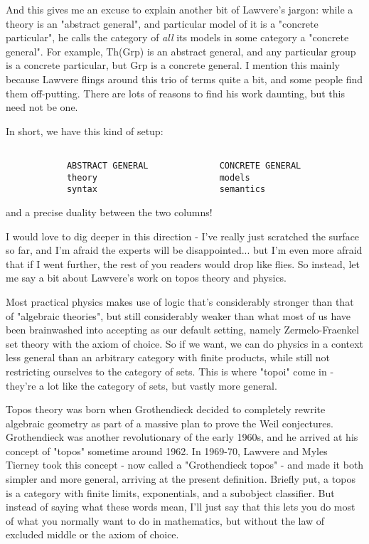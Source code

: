 And this gives me an excuse to explain another bit of Lawvere's
jargon: while a theory is an "abstract general", and
particular model of it is a "concrete particular", he calls
the category of \emph{all} its models in some category a
"concrete general".  For example, Th(Grp) is an abstract
general, and any particular group is a concrete particular, but Grp is
a concrete general.  I mention this mainly because Lawvere flings
around this trio of terms quite a bit, and some people find them
off-putting.  There are lots of reasons to find his work daunting, but
this need not be one.

In short, we have this kind of setup:


\begin{verbatim}

            ABSTRACT GENERAL              CONCRETE GENERAL
            theory                        models
            syntax                        semantics
\end{verbatim}
    
and a precise duality between the two columns!

I would love to dig deeper in this direction - I've really just
scratched the surface so far, and I'm afraid the experts will be
disappointed... but I'm even more afraid that if I went further,
the rest of you readers would drop like flies.  So instead, let me 
say a bit about Lawvere's work on topos theory and physics.  

Most practical physics makes use of logic that's considerably stronger
than that of "algebraic theories", but still considerably
weaker than what most of us have been brainwashed into accepting as
our default setting, namely Zermelo-Fraenkel set theory with the axiom
of choice.  So if we want, we can do physics in a context less general
than an arbitrary category with finite products, while still not
restricting ourselves to the category of sets.  This is where
"topoi" come in - they're a lot like the category of sets,
but vastly more general.

Topos theory was born when Grothendieck decided to completely rewrite
algebraic geometry as part of a massive plan to prove the Weil
conjectures.  Grothendieck was another revolutionary of the early
1960s, and he arrived at his concept of "topos" sometime
around 1962.  In 1969-70, Lawvere and Myles Tierney took this concept -
now called a "Grothendieck topos" - and made it both simpler
and more general, arriving at the present definition.  Briefly put, a
topos is a category with finite limits, exponentials, and a subobject
classifier.  But instead of saying what these words mean, I'll just
say that this lets you do most of what you normally want to do in
mathematics, but without the law of excluded middle or the axiom of
choice.

